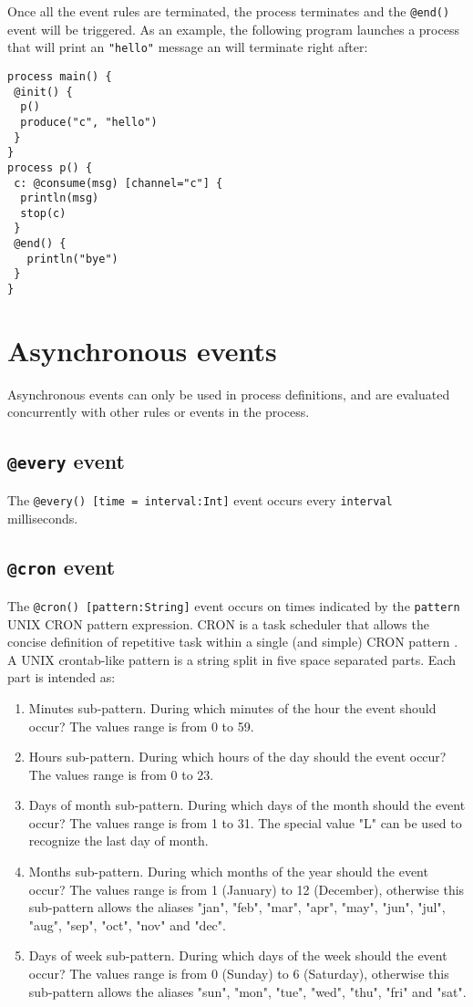 \documentclass[11pt]{report}
\begin{document}
Once all the event rules are terminated, the process terminates and the \texttt{@end()} event will be triggered. As an example, the following program launches a process that will print an \texttt{"hello"} message an will terminate right after:

\begin{lstlisting}
process main() {
 @init() {
  p()
  produce("c", "hello")
 }
}
process p() {
 c: @consume(msg) [channel="c"] {
  println(msg)
  stop(c)
 }
 @end() {
   println("bye")
 }
}
\end{lstlisting}

\section{Asynchronous events\label{sec:asynchronous_events}}

Asynchronous events can only be used in process definitions, and are evaluated concurrently with other rules or events in the process. 

\subsection{\texttt{@every} event}

The \texttt{@every() [time = interval:Int]} event occurs every \texttt{interval} milliseconds.

\subsection{\texttt{@cron} event}

The \texttt{@cron() [pattern:String]} event occurs on times indicated by the \texttt{pattern} UNIX CRON pattern expression. CRON is a task scheduler that allows the concise definition of repetitive task within a single (and simple) CRON pattern \cite{franta1977}. A UNIX crontab-like pattern is a string split in five space separated parts. Each part is intended as:

\begin{enumerate}
\item Minutes sub-pattern. During which minutes of the hour the event should occur? The values range is from 0 to 59.
\item Hours sub-pattern. During which hours of the day should the event occur? The values range is from 0 to 23.
\item Days of month sub-pattern. During which days of the month should the event occur? The values range is from 1 to 31. The special value "L" can be used to recognize the last day of month.
\item Months sub-pattern. During which months of the year should the event occur? The values range is from 1 (January) to 12 (December), otherwise this sub-pattern allows the aliases "jan", "feb", "mar", "apr", "may", "jun", "jul", "aug", "sep", "oct", "nov" and "dec".
\item Days of week sub-pattern. During which days of the week should the event occur? The values range is from 0 (Sunday) to 6 (Saturday), otherwise this sub-pattern allows the aliases "sun", "mon", "tue", "wed", "thu", "fri" and "sat".
\end{enumerate}
\end{document}
